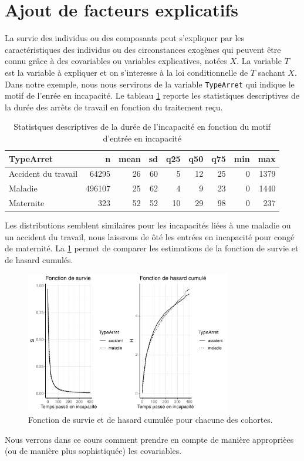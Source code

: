 \section{Ajout de facteurs explicatifs}
La survie des individus ou des composants peut s'expliquer par les caractéristiques des individus ou des circonstances exogènes qui peuvent être connu grâce à des covariables ou variables explicatives, notées $X$. La variable $T$ est la variable à expliquer et on s'interesse à la loi conditionnelle de $T$ sachant $X$. Dans notre exemple, nous nous servirons de la variable \texttt{TypeArret} qui indique le motif de l'enrée en incapacité. Le tableau \cref{tab:stat_desc_by_TypeArret} reporte les statistiques descriptives de la durée des arrêts de travail en fonction du traitement reçu.  
 \begin{table}[ht]
\centering
\begin{tabular}{l|rrrrrrrr}
  \hline
  TypeArret & n & mean & sd & q25 & q50 & q75 & min & max \\ 
  \hline
Accident du travail & 64295 & 26 & 60 & 5 & 12 & 25 & 0 & 1379 \\ 
 Maladie & 496107 & 25 & 62 & 4 & 9 & 23 & 0 & 1440 \\ 
 Maternite & 323 & 52 & 52 & 10 & 29 & 98 & 0 & 237 \\ 
   \hline
\end{tabular}
\caption{Statistques descriptives de la durée de l'incapacité en fonction du motif d'entrée en incapacité}
\label{tab:stat_desc_by_TypeArret}
\end{table}
Les distributions semblent similaires pour les incapacités liées à une maladie ou un accident du travail, nous laissrons de ôté les entrées en incapacité pour congé de maternité. La \cref{fig:INC_S_H_cohorte} permet de comparer les estimations de la fonction de survie et de hasard cumulés.
\begin{figure}[h!]
\centering
\includegraphics[width = 0.8\textwidth]{../figures/INC_S_H_cohorte}
\caption{Fonction de survie et de hasard cumulée pour chacune des cohortes.}
\label{fig:INC_S_H_cohorte}
\end{figure}
Nous verrons dans ce cours comment prendre en compte de manière approprièes (ou de manière plus sophistiquée) les covariables.


